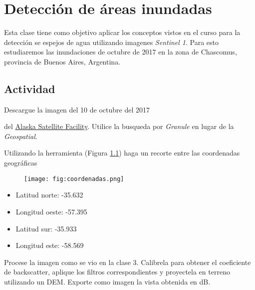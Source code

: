 \chapter{Detección de áreas inundadas}

Esta clase tiene como objetivo aplicar los conceptos vistos en el curso para la detección se espejos de agua utilizando imagenes \emph{Sentinel 1}. Para esto estudiaremos las inundaciones de octubre de 2017 en la zona de Chascomus, provincia de Buenos Aires, Argentina.



\section{Actividad}

\begin{que}
    Descargue la imagen del 10 de octubre del 2017
    \begin{center}\end{center} del \href{https://vertex.daac.asf.alaska.edu/}{Alaska Satellite Facility}. Utilice la busqueda por \emph{Granule} en lugar de la \emph{Geospatial}.
\end{que}

\begin{que}
    Utilizando la herramienta  (Figura \ref{fig:coordenadas}) haga un recorte entre las coordenadas geográficas
    \begin{figure}[h!]
        \centering
        \texttt{[image: fig:coordenadas.png]}
        \caption{}
        \label{fig:coordenadas}
    \end{figure}
    \begin{itemize}
        \item Latitud norte: -35.632
        \item Longitud oeste: -57.395
        \item Latitud sur: -35.933
        \item Longitud este: -58.569
    \end{itemize}


\end{que}

\begin{que}
    Procese la imagen como se vio en la clase 3. Calibrela para obtener el coeficiente de backscatter, aplique los filtros correspondientes y proyectela en terreno utilizando un DEM. Exporte como imagen la vista obtenida en dB.
\end{que}

